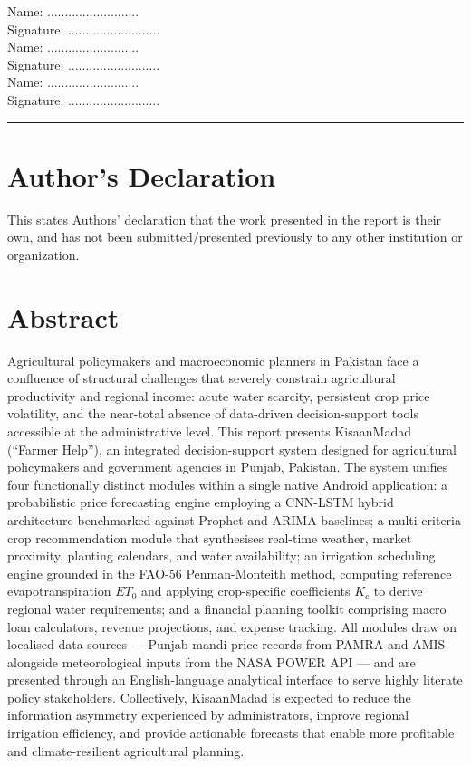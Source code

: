 \documentclass{FastFyp}
\begin{document}
\begin{flushright}
Name: ..........................
\\[3ex]
Signature: ..........................
\\[6ex]
Name: ..........................
\\[3ex]
Signature: ..........................
\\[6ex]
Name: ..........................
\\[3ex]
Signature: ..........................

\end{flushright} 

\vspace{5 cm} %
 
\hrule %

\section*{Author's Declaration}
This states Authors’ declaration that the work presented in the report is their own, and has not been submitted/presented previously to any other institution or organization.
\pagebreak
\section*{Abstract}
Agricultural policymakers and macroeconomic planners in Pakistan face a confluence of structural challenges that severely constrain agricultural productivity and regional income: acute water scarcity, persistent crop price volatility, and the near-total absence of data-driven decision-support tools accessible at the administrative level. This report presents KisaanMadad (``Farmer Help''), an integrated decision-support system designed for agricultural policymakers and government agencies in Punjab, Pakistan. The system unifies four functionally distinct modules within a single native Android application: a probabilistic price forecasting engine employing a CNN-LSTM hybrid architecture benchmarked against Prophet and ARIMA baselines; a multi-criteria crop recommendation module that synthesises real-time weather, market proximity, planting calendars, and water availability; an irrigation scheduling engine grounded in the FAO-56 Penman-Monteith method, computing reference evapotranspiration $ET_0$ and applying crop-specific coefficients $K_c$ to derive regional water requirements; and a financial planning toolkit comprising macro loan calculators, revenue projections, and expense tracking. All modules draw on localised data sources --- Punjab mandi price records from PAMRA and AMIS alongside meteorological inputs from the NASA POWER API --- and are presented through an English-language analytical interface to serve highly literate policy stakeholders. Collectively, KisaanMadad is expected to reduce the information asymmetry experienced by administrators, improve regional irrigation efficiency, and provide actionable forecasts that enable more profitable and climate-resilient agricultural planning.
\pagebreak
\end{document}

